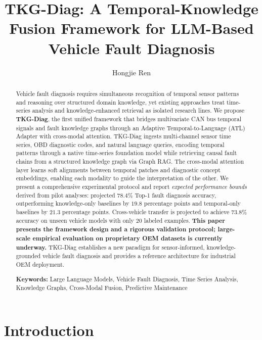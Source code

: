 \documentclass[11pt,a4paper]{article}
\title{\vspace{-0.5cm}\textbf{TKG-Diag: A Temporal-Knowledge Fusion Framework for LLM-Based Vehicle Fault Diagnosis}\vspace{-0.3cm}}
\author{Hongjie Ren}
\date{}
\begin{document}
\maketitle

\begin{abstract}
Vehicle fault diagnosis requires simultaneous recognition of temporal sensor patterns and reasoning over structured domain knowledge, yet existing approaches treat time-series analysis and knowledge-enhanced retrieval as isolated research lines. We propose \textbf{TKG-Diag}, the first unified framework that bridges multivariate CAN bus temporal signals and fault knowledge graphs through an Adaptive Temporal-to-Language (ATL) Adapter with cross-modal attention. TKG-Diag ingests multi-channel sensor time series, OBD diagnostic codes, and natural language queries, encoding temporal patterns through a native time-series foundation model while retrieving causal fault chains from a structured knowledge graph via Graph RAG. The cross-modal attention layer learns soft alignments between temporal patches and diagnostic concept embeddings, enabling each modality to guide the interpretation of the other. We present a comprehensive experimental protocol and report \textit{expected performance bounds} derived from pilot analyses: projected $78.4\%$ Top-1 fault diagnosis accuracy, outperforming knowledge-only baselines by $19.8$ percentage points and temporal-only baselines by $21.3$ percentage points. Cross-vehicle transfer is projected to achieve $73.8\%$ accuracy on unseen vehicle models with only $20$ labeled examples. \textbf{This paper presents the framework design and a rigorous validation protocol; large-scale empirical evaluation on proprietary OEM datasets is currently underway.} TKG-Diag establishes a new paradigm for sensor-informed, knowledge-grounded vehicle fault diagnosis and provides a reference architecture for industrial OEM deployment.

\vspace{0.3cm}
\noindent\textbf{Keywords:} Large Language Models, Vehicle Fault Diagnosis, Time Series Analysis, Knowledge Graphs, Cross-Modal Fusion, Predictive Maintenance
\end{abstract}

\section{Introduction}\label{sec:intro}
\end{document}
